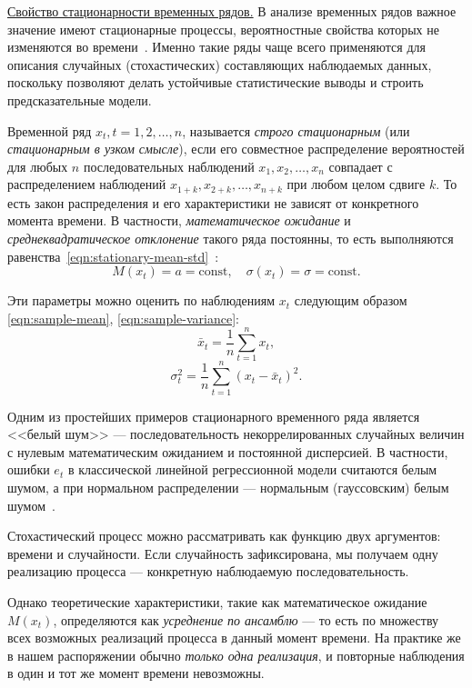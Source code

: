 \ul{Свойство стационарности временных рядов.} В анализе временных рядов важное значение имеют стационарные процессы, вероятностные свойства которых не изменяются во времени~\cite{VolkovRandomProcesses, MezhennayaRandomProcesses}. Именно такие ряды чаще всего применяются для описания случайных (стохастических) составляющих наблюдаемых данных, поскольку позволяют делать устойчивые статистические выводы и строить предсказательные модели.

Временной ряд $x_t, t = 1, 2, \ldots, n$, называется \textit{строго стационарным} (или \textit{стационарным в узком смысле}), если его совместное распределение вероятностей для любых $n$ последовательных наблюдений $x_1, x_2, \ldots, x_n$ совпадает с распределением наблюдений $x_{1+k}, x_{2+k}, \ldots, x_{n+k}$ при любом целом сдвиге $k$. То есть закон распределения и его характеристики не зависят от конкретного момента времени. В частности, \textit{математическое ожидание} и \textit{среднеквадратическое отклонение} такого ряда постоянны, то есть выполняются равенства~\eqref{eqn:stationary-mean-std}~\cite{BrockwellDavis2016}:
\begin{equation}
\label{eqn:stationary-mean-std}
M(x_t) = a = \text{const}, \quad \sigma(x_t) = \sigma = \text{const}.
\end{equation}

Эти параметры можно оценить по наблюдениям $x_t$ следующим образом \eqref{eqn:sample-mean}, \eqref{eqn:sample-variance}:
\begin{equation}
\label{eqn:sample-mean}
\bar{x}_t = \frac{1}{n} \sum_{t=1}^{n} x_t,
\end{equation}
\begin{equation}
\label{eqn:sample-variance}
\sigma_t^2 = \frac{1}{n} \sum_{t=1}^{n} (x_t - \bar{x}_t)^2.
\end{equation}


Одним из простейших примеров стационарного временного ряда является <<белый шум>> — последовательность некоррелированных случайных величин с нулевым математическим ожиданием и постоянной дисперсией. В частности, ошибки $e_t$ в классической линейной регрессионной модели считаются белым шумом, а при нормальном распределении — нормальным (гауссовским) белым шумом~\cite{BrockwellDavis2016}.

Стохастический процесс можно рассматривать как функцию двух аргументов: времени и случайности.
Если случайность зафиксирована, мы получаем одну реализацию процесса — конкретную наблюдаемую последовательность.

Однако теоретические характеристики, такие как математическое ожидание $M(x_t)$, определяются как \textit{усреднение по ансамблю} --- то есть по множеству всех возможных реализаций процесса в данный момент времени. На практике же в нашем распоряжении обычно \textit{только одна реализация}, и повторные наблюдения в один и тот же момент времени невозможны.

